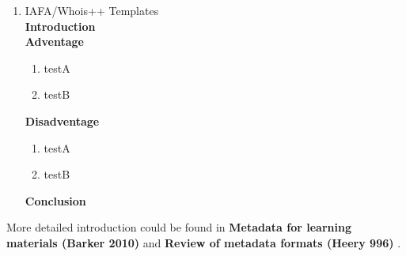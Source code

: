 \begin{enumerate}
	{\bf Adventage}
	\begin{enumerate}
		\item testA
		\item testB
	\end{enumerate}	
	{\bf Disadventage}
	\begin{enumerate}
		\item testA
		\item testB
	\end{enumerate}
	{\bf Conclusion}\\
	
	\item IAFA/Whois++ Templates\\
	{\bf Introduction}\\
	
	{\bf Adventage}
	\begin{enumerate}
		\item testA
		\item testB
	\end{enumerate}	
	{\bf Disadventage}
	\begin{enumerate}
		\item testA
		\item testB
	\end{enumerate}
	{\bf Conclusion}\\	
	
\end{enumerate}

More detailed introduction could be found in {\bf Metadata for learning materials (Barker 2010)} \cite{barker2010metadata} and {\bf Review of metadata formats (Heery 996)} \cite{heery1996review}.



